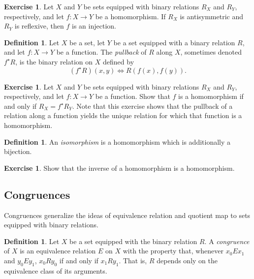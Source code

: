 \documentclass[letterpaper]{article}
\theoremstyle{definition}
\newtheorem{definition}[theorem]{Definition}
\newtheorem{exercise}[theorem]{Exercise}
\newcommand{\defterm}{\emph}
\begin{document}
\begin{exercise}
  Let \(X\) and \(Y\) be sets equipped with binary relations \(R_X\)
  and \(R_Y\), respectively, and let \(f:X \to Y\) be a homomorphism.
  If \(R_X\) is antisymmetric and \(R_Y\) is reflexive, then \(f\) is
  an injection.
\end{exercise}

\begin{definition}
  Let \(X\) be a set, let \(Y\) be a set equipped with a binary
  relation \(R\), and let \(f:X \to Y\) be a function.  The
  \defterm{pullback} of \(R\) along \(X\), sometimes denoted \(f^\star
  R\), is the binary relation on \(X\) defined by
  \[(f^\star R)(x, y) \iff R(f(x), f(y)) \text{.}\]
\end{definition}

\begin{exercise}
  Let \(X\) and \(Y\) be sets equipped with binary relations \(R_X\)
  and \(R_Y\), respectively, and let \(f:X \to Y\) be a function.
  Show that \(f\) is a homomorphism if and only if \(R_X = f^\star
  R_Y\).  Note that this exercise shows that the pullback of a
  relation along a function yields the unique relation for which that
  function is a homomorphism.
\end{exercise}

\begin{definition}
  An \defterm{isomorphism} is a homomorphism which is additionally a
  bijection.
\end{definition}

\begin{exercise}
  Show that the inverse of a homomorphism is a homomorphism.
\end{exercise}

\subsection{Congruences}
Congruences generalize the ideas of equivalence relation and quotient
map to sets equipped with binary relations.

\begin{definition}
  Let \(X\) be a set equipped with the binary relation \(R\).  A
  \defterm{congruence} of \(X\) is an equivalence relation \(E\) on
  \(X\) with the property that, whenever \(x_0Ex_1\) and \(y_0Ey_1\),
  \(x_0Ry_0\) if and only if \(x_1Ry_1\).  That is, \(R\) depends only
  on the equivalence class of its arguments.
\end{definition}
\end{document}
